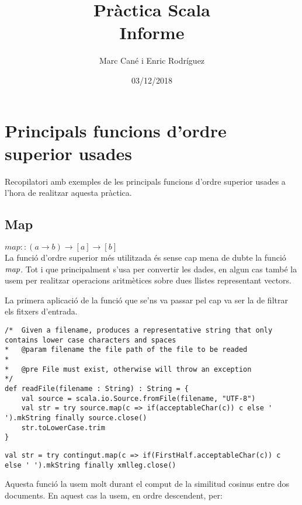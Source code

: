\documentclass{report}
\begin{document}
\title{Pràctica Scala \\ Informe}
\author{Marc Cané i Enric Rodríguez}
\date{03/12/2018}
\maketitle

\newpage
\tableofcontents

\newpage
\chapter{Principals funcions d'ordre superior usades}
Recopilatori amb exemples de les principals funcions d'ordre superior usades a l'hora de realitzar aquesta pràctica.

\section{Map}

$ map :: (a \rightarrow b) \rightarrow [a] \rightarrow [b] $ \\

La funció d'ordre superior més utilitzada és sense cap mena de dubte la funció $ \emph{map} $. Tot i que principalment s'usa per convertir les dades, en algun cas també la usem per realitzar operacions aritmètices sobre dues llistes representant vectors.

La primera aplicació de la funció que se'ns va passar pel cap va ser la de filtrar els fitxers d'entrada.

\begin{lstlisting}[style=scalaHighlight]
/*	Given a filename, produces a representative string that only contains lower case characters and spaces
* 	@param filename the file path of the file to be readed
* 	
* 	@pre File must exist, otherwise will throw an exception
*/
def readFile(filename : String) : String = {
	val source = scala.io.Source.fromFile(filename, "UTF-8")
	val str = try source.map(c => if(acceptableChar(c)) c else ' ').mkString finally source.close()
	str.toLowerCase.trim
}
\end{lstlisting}

\begin{lstlisting}[style=scalaHighlight]
val str = try contingut.map(c => if(FirstHalf.acceptableChar(c)) c else ' ').mkString finally xmlleg.close()
\end{lstlisting}

\newpage

Aquesta funció la usem molt durant el comput de la similitud cosinus entre dos documents. En aquest cas la usem, en ordre descendent, per:
\end{document}
